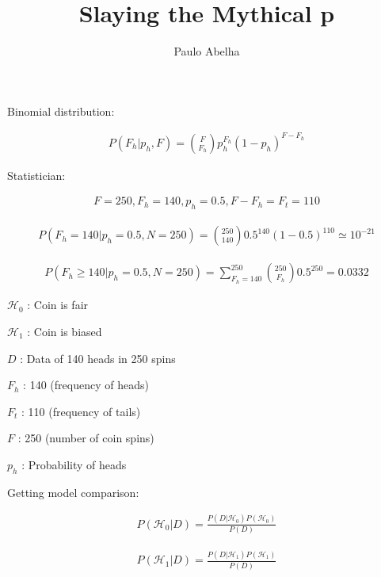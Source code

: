 \documentclass[12pt]{article}
\begin{document}
 

\pagecolor{blogger-black}
\color{white} 
 
\title{Slaying the Mythical p}
\author{Paulo Abelha}
\maketitle

Binomial distribution:

\begin{gather}
P(F_h | p_h, F) = \binom{F}{F_h}p_h^{F_h}(1-p_h)^{F-F_h}
\end{gather}

Statistician:

\begin{gather}
F = 250, F_h = 140, p_h = 0.5, F-F_h = F_t = 110
\end{gather}

\begin{gather}
P(F_h = 140 | p_h =0.5, N=250) = \binom{250}{140}0.5^{140}(1-0.5)^{110} \simeq 10^{-21}
\end{gather}

\begin{gather}
P(F_h \geq 140 | p_h =0.5, N=250) = \sum_{F_h=140}^{250} \binom{250}{F_h}0.5^{250} = 0.0332
\end{gather}

$\mathcal{H}_0$ : Coin is fair

$\mathcal{H}_1$ : Coin is biased

$D$ : Data of 140 heads in 250 spins

$F_h$ :  140 (frequency of heads)

$F_t$ :  110 (frequency of tails)

$F$ : 250 (number of coin spins)

$p_h$ : Probability of heads

Getting model comparison:

\begin{gather}
P(\mathcal{H}_0 | D) = \frac{P(D | \mathcal{H}_0)P(\mathcal{H}_0)}{P(D)}
\end{gather}

\begin{gather}
P(\mathcal{H}_1 | D) = \frac{P(D | \mathcal{H}_1)P(\mathcal{H}_1)}{P(D)}
\end{gather}
\end{document}
